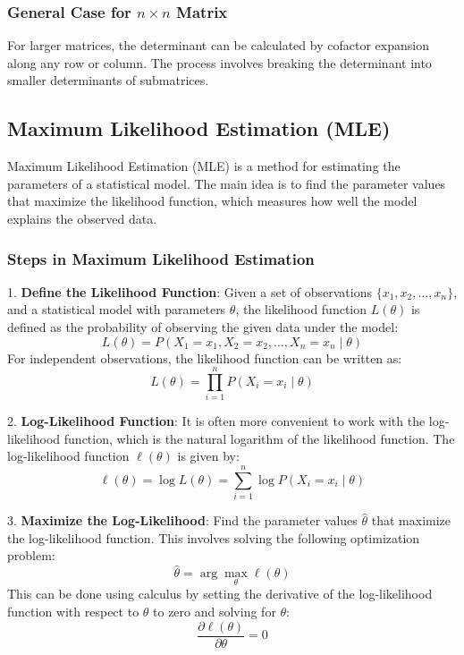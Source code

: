 \subsubsection*{General Case for $n \times n$ Matrix}
For larger matrices, the determinant can be calculated by cofactor expansion along any row or column. The process involves breaking the determinant into smaller determinants of submatrices.


\subsection{Maximum Likelihood Estimation (MLE)}

Maximum Likelihood Estimation (MLE) is a method for estimating the parameters of a statistical model. The main idea is to find the parameter values that maximize the likelihood function, which measures how well the model explains the observed data.

\subsubsection*{Steps in Maximum Likelihood Estimation}

1. \textbf{Define the Likelihood Function}:
   Given a set of observations \(\{x_1, x_2, \ldots, x_n\}\), and a statistical model with parameters \(\theta\), the likelihood function \(L(\theta)\) is defined as the probability of observing the given data under the model:
   \[
   L(\theta) = P(X_1 = x_1, X_2 = x_2, \ldots, X_n = x_n \mid \theta)
   \]
   For independent observations, the likelihood function can be written as:
   \[
   L(\theta) = \prod_{i=1}^n P(X_i = x_i \mid \theta)
   \]

2. \textbf{Log-Likelihood Function}:
   It is often more convenient to work with the log-likelihood function, which is the natural logarithm of the likelihood function. The log-likelihood function \(\ell(\theta)\) is given by:
   \[
   \ell(\theta) = \log L(\theta) = \sum_{i=1}^n \log P(X_i = x_i \mid \theta)
   \]

3. \textbf{Maximize the Log-Likelihood}:
   Find the parameter values \(\hat{\theta}\) that maximize the log-likelihood function. This involves solving the following optimization problem:
   \[
   \hat{\theta} = \arg\max_\theta \ell(\theta)
   \]
   This can be done using calculus by setting the derivative of the log-likelihood function with respect to \(\theta\) to zero and solving for \(\theta\):
   \[
   \frac{\partial \ell(\theta)}{\partial \theta} = 0
   \]

